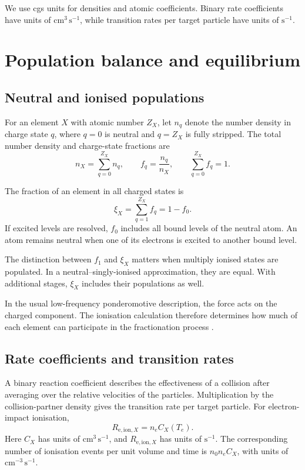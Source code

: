 \documentclass[a4paper,10pt,twoside,openany]{book}
\newcommand{\ChapColor}{Cap1Blue}
\newcommand{\ChapColorLight}{LightBlue}
\newcommand{\setChapColor}[2]{%
  \renewcommand{\ChapColor}{#1}%
  \renewcommand{\ChapColorLight}{#2}}
\numberwithin{equation}{chapter}
\newenvironment{definition}[1]{%
  \begin{tcolorbox}[bookbox,colback=\ChapColorLight,
    colframe=\ChapColor,colbacktitle=\ChapColor,coltitle=white,
    title={Definition: #1}]}{\end{tcolorbox}}
\begin{document}
We use cgs units for densities and atomic coefficients. Binary rate
coefficients have units of $\mathrm{cm^3\,s^{-1}}$, while transition
rates per target particle have units of $\mathrm{s^{-1}}$.

\tableofcontents
\mainmatter

\setChapColor{Cap1Blue}{LightBlue}
\chapter{Population balance and equilibrium}

\section{Neutral and ionised populations}
For an element $X$ with atomic number $Z_X$, let $n_q$ denote the
number density in charge state $q$, where $q=0$ is neutral and
$q=Z_X$ is fully stripped. The total number density and charge-state
fractions are
\begin{equation}
  n_X=\sum_{q=0}^{Z_X}n_q,\qquad
  f_q=\frac{n_q}{n_X},\qquad
  \sum_{q=0}^{Z_X}f_q=1.
\end{equation}

\begin{definition}{Total ionised fraction}
The fraction of an element in all charged states is
\begin{equation}
  \xi_X=\sum_{q=1}^{Z_X}f_q=1-f_0.
  \label{eq:xi}
\end{equation}
If excited levels are resolved, $f_0$ includes all bound levels of the
neutral atom. An atom remains neutral when one of its electrons is
excited to another bound level.
\end{definition}

The distinction between $f_1$ and $\xi_X$ matters when multiply ionised
states are populated. In a neutral--singly-ionised approximation, they
are equal. With additional stages, $\xi_X$ includes their populations
as well.

In the usual low-frequency ponderomotive description, the force acts
on the charged component. The ionisation calculation therefore
determines how much of each element can participate in the
fractionation process \cite{Laming2015}.

\section{Rate coefficients and transition rates}
A binary reaction coefficient describes the effectiveness of a
collision after averaging over the relative velocities of the
particles. Multiplication by the collision-partner density gives the
transition rate per target particle. For electron-impact ionisation,
\begin{equation}
  R_{\mathrm{e,ion},X}=n_e C_X(T_e).
  \label{eq:electron_rate}
\end{equation}
Here $C_X$ has units of $\mathrm{cm^3\,s^{-1}}$, and $R_{\mathrm{e,ion},X}$
has units of $\mathrm{s^{-1}}$. The corresponding number of ionisation
events per unit volume and time is $n_0n_eC_X$, with units of
$\mathrm{cm^{-3}\,s^{-1}}$.
\end{document}
